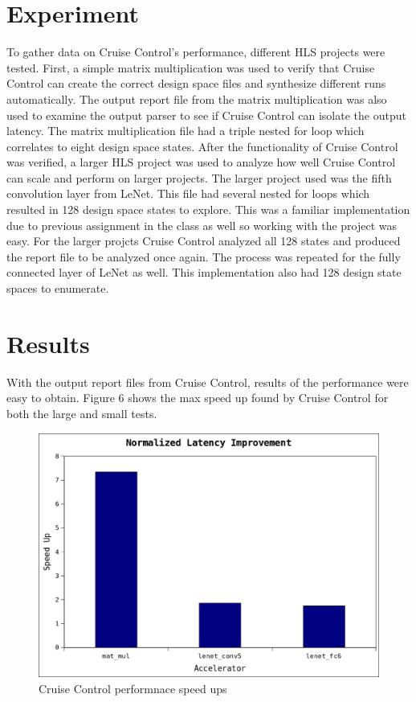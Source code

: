 \documentclass[letterpaper, 10 pt, conference]{IEEEconf}  %
\begin{document}
\section{Experiment}
To gather data on Cruise Control's performance, different HLS projects were tested. First, a simple matrix multiplication was used to verify that Cruise Control can create the correct design space files and synthesize different runs automatically. The output report file from the matrix multiplication was also used to examine the output parser to see if Cruise Control can isolate the output latency. The matrix multiplication file had a triple nested for loop which correlates to eight design space states. \newline 
\indent After the functionality of Cruise Control was verified, a larger HLS project was used to analyze how well Cruise Control can scale and perform on larger projects. The larger project used was the fifth convolution layer from LeNet. This file had several nested for loops which resulted in 128 design space states to explore. This was a familiar implementation due to previous assignment in the class as well so working with the project was easy. For the larger projcts Cruise Control analyzed all 128 states and produced the report file to be analyzed once again. The process was repeated for the fully connected layer of LeNet as well. This implementation also had 128 design state spaces to enumerate.  


\section{Results}
With the output report files from Cruise Control, results of the performance were easy to obtain. Figure 6 shows the max speed up found by Cruise Control for both the large and small tests. 

\begin{figure}[H]
\centering
\includegraphics[scale=.4]{result0.png} 
\caption{Cruise Control performnace speed ups}
\end{figure}
\end{document}
